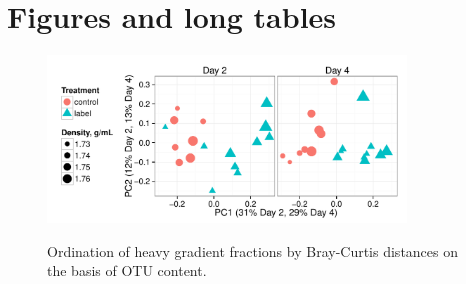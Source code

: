 \section{Figures and long tables}
\newpage



\begin{figure}[H]
  \centering
  \caption{Ordination of heavy gradient fractions by Bray-Curtis distances on the basis of OTU content.}
  \includegraphics[width=0.85\textwidth]{figures/ordination_heavy/ordination_heavy_day_facet.pdf}
  \label{fig:ord_heavy}
\end{figure}

